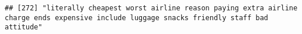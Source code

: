 \documentclass[
]{article}
\begin{document}
\begin{verbatim}
## [272] "literally cheapest worst airline reason paying extra airline charge ends expensive include luggage snacks friendly staff bad attitude"                                                                                                                                                                                                                                                                                                                                                                                                                                                                                                                                                                                                                                                                                                                                                                                                                                                                                                                                                                                                                                                                                                                                                                                                                                                                                                                                                                                                                                                                                                                                                                                                                                                         

\end{verbatim}
\end{document}
